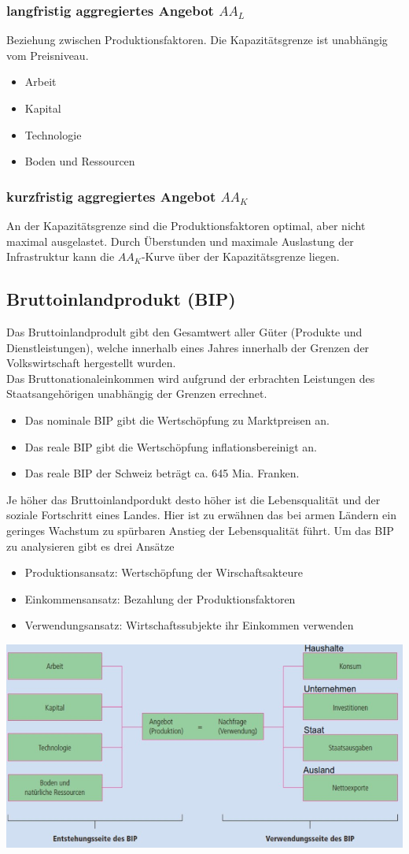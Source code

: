 	\subsubsection{langfristig aggregiertes Angebot $AA_L$}
	Beziehung zwischen Produktionsfaktoren. Die Kapazitätsgrenze ist unabhängig vom Preisniveau.
	\begin{itemize}
		\item Arbeit
		\item Kapital
		\item Technologie
		\item Boden und Ressourcen
	\end{itemize}
	\subsubsection{kurzfristig aggregiertes Angebot $AA_K$}
	An der Kapazitätsgrenze sind die Produktionsfaktoren optimal, aber nicht maximal ausgelastet. Durch Überstunden und maximale Auslastung der Infrastruktur kann die $AA_K$-Kurve über der Kapazitätsgrenze liegen.
\clearpage
\pagebreak
\subsection{Bruttoinlandprodukt (BIP)}
Das Bruttoinlandprodult gibt den Gesamtwert aller Güter (Produkte und Dienstleistungen), welche innerhalb eines Jahres innerhalb der Grenzen der Volkswirtschaft hergestellt wurden.\\
Das Bruttonationaleinkommen wird aufgrund der erbrachten Leistungen des Staatsangehörigen unabhängig der Grenzen errechnet.
\begin{itemize}
	\item Das nominale BIP gibt die Wertschöpfung zu Marktpreisen an.
	\item Das reale BIP gibt die Wertschöpfung inflationsbereinigt an.
	\item Das reale BIP der Schweiz beträgt ca. 645 Mia. Franken.
\end{itemize}
Je höher das Bruttoinlandpordukt desto höher ist die  Lebensqualität und der soziale Fortschritt eines Landes. Hier ist zu erwähnen das bei armen Ländern ein geringes Wachstum zu spürbaren Anstieg der Lebensqualität führt. Um das BIP zu analysieren gibt es drei Ansätze
\begin{itemize}
	\item Produktionsansatz: Wertschöpfung der Wirschaftsakteure
	\item Einkommensansatz: Bezahlung der Produktionsfaktoren
	\item Verwendungsansatz: Wirtschaftssubjekte ihr Einkommen verwenden
\end{itemize}
\includegraphics[width=0.8\linewidth]{images/bip.jpg}
\clearpage
\pagebreak